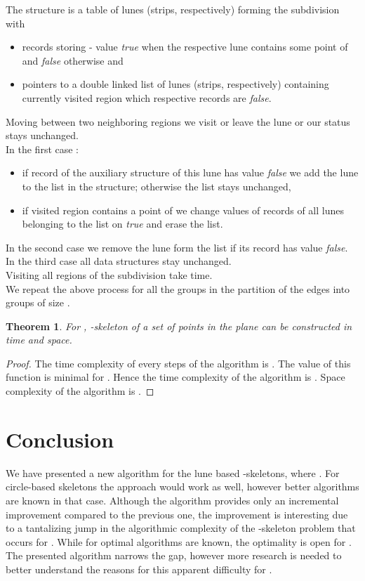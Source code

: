 \documentclass[10pt]{article}
\newtheorem{theorem}{\textbf{Theorem}}[section]
\begin{document}
The structure is a table of lunes (strips, respectively) forming the subdivision with 
\begin{itemize}
\item
records storing - value {\em true} when the respective lune contains some point of  and {\em false} 
otherwise and
\item
pointers to a double linked list of lunes (strips, respectively) containing currently visited region which 
respective records are {\em false}.
\end{itemize}
Moving between two neighboring regions we visit or leave the lune or our status stays unchanged. \\
In the first case : 
\begin{itemize}
\item
if record of the auxiliary structure of this lune has value {\em false} we add the lune to the list 
in the structure; 
otherwise the list stays unchanged, 
\item 
if visited region contains a point of  we change values of records of all lunes belonging to the list 
on {\em true} and erase the list.
\end{itemize}
In the second case we remove the lune form the list if its record has value {\em false}. \\
In the third case all data structures stay unchanged. \\
Visiting all regions of the subdivision take  time. \\
We repeat the above process for all the groups in the partition of the edges into
groups of size .

\begin{theorem}
For , -skeleton of a set  of  points in the plane can be constructed 
in  time and  space.
\end{theorem}
\begin{proof}
The time complexity of every steps of the algorithm is 
. 
The value of this function is minimal for  . Hence the time complexity of the algorithm 
is . Space complexity of the algorithm is  .  
\end{proof}





\section{Conclusion}


We have presented a new algorithm for the lune based -skeletons, where . For circle-based skeletons the approach would work as well, 
however better algorithms are known in that case.
Although the algorithm provides only an incremental improvement
compared to the previous one, the improvement is interesting due to
a tantalizing jump in the algorithmic complexity of the -skeleton problem
that occurs for . While for  optimal
algorithms are known,  the optimality is open for .
The presented algorithm narrows the gap, however more research is needed to
better understand the reasons for this apparent difficulty for .
\end{document}

